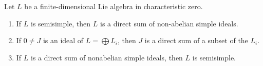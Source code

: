 Let $L$ be a finite-dimensional Lie algebra in characteristic zero.
\begin{enumerate}[label=(\roman*)]
	\item If $L$ is semisimple, then $L$ is a direct sum of non-abelian simple
		ideals.
	\item If $0\neq J$ is an ideal of $L = \bigoplus L_i$, then $J$ is a direct
		sum of a subset of the $L_i$.
	\item If $L$ is a direct sum of nonabelian simple ideals, then $L$ is
		semisimple.
\end{enumerate}
